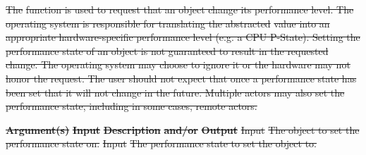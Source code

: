 \documentclass[12pt]{report} %
\providecommand{\DIFdeltex}[1]{{\protect\color{red}\sout{#1}}}                      %
\providecommand{\DIFdelbegin}{} %
\providecommand{\DIFdel}[1]{\texorpdfstring{\DIFdeltex{#1}}{}} %
\newcommand{\DIFscaledelfig}{0.5}
\newlength{\DIFdelgraphicswidth} %
\newlength{\DIFdelgraphicsheight} %
\newcommand{\DIFdelincludegraphics}[2][]{%
\sbox{\DIFdelgraphicsbox}{\DIFOincludegraphics[#1]{#2}}%
\settoboxwidth{\DIFdelgraphicswidth}{\DIFdelgraphicsbox} %
\settoboxtotalheight{\DIFdelgraphicsheight}{\DIFdelgraphicsbox} %
\scalebox{\DIFscaledelfig}{%
\parbox[b]{\DIFdelgraphicswidth}{\usebox{\DIFdelgraphicsbox}\\[-\baselineskip] \rule{\DIFdelgraphicswidth}{0em}}\llap{\resizebox{\DIFdelgraphicswidth}{\DIFdelgraphicsheight}{%
\setlength{\unitlength}{\DIFdelgraphicswidth}%
\begin{picture}(1,1)%
\thicklines\linethickness{2pt} %
{\color[rgb]{1,0,0}\put(0,0){\framebox(1,1){}}}%
{\color[rgb]{1,0,0}\put(0,0){\line( 1,1){1}}}%
{\color[rgb]{1,0,0}\put(0,1){\line(1,-1){1}}}%
\end{picture}%
}\hspace*{3pt}}} %
} %
\DeclareRobustCommand{\DIFdelbegin}{\DIFOdelbegin \let\includegraphics\DIFdelincludegraphics} %
\begin{document}
\DIFdelbegin %

\DIFdel{The }%
\DIFdel{function is used to request that an object change its performance level. 
The operating system is responsible for translating the abstracted }%
\DIFdel{value into
an appropriate hardware-specific performance level (e.g. a CPU P-State).
Setting the performance state of an object is not guaranteed to result in the requested change. The
operating system may choose to ignore it or the hardware may not honor the request. The user should
not expect that once a performance state has been set that it will not change in the future. Multiple
actors may also set the performance state, including in some cases, remote actors. 
}%


\textbf{\DIFdel{Argument(s)}} %
\textbf{\DIFdel{Input}}  %
\textbf{\DIFdel{Description}} %
\textbf{\DIFdel{and/or}}     %
\textbf{\DIFdel{Output}} %
\DIFdel{Input  }%
\DIFdel{The object to set the performance state on.  }%
\DIFdel{Input }%
\DIFdel{The performance state to set the object to. }%
\end{document}
